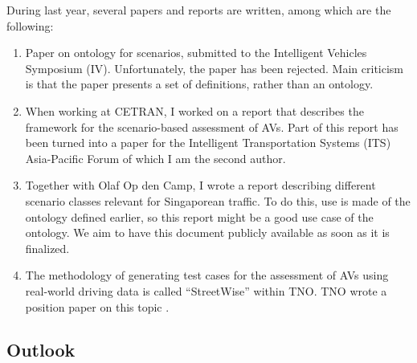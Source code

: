 During last year, several papers and reports are written, among which are the following:
\begin{enumerate}
	\item Paper on ontology for scenarios, submitted to the Intelligent Vehicles Symposium (IV). Unfortunately, the paper has been rejected. Main criticism is that the paper presents a set of definitions, rather than an ontology. 
	\item When working at CETRAN, I worked on a report that describes the framework for the scenario-based assessment of AVs. Part of this report has been turned into a paper for the Intelligent Transportation Systems (ITS) Asia-Pacific Forum \cite{ploeg2018cetran} of which I am the second author.
	\item Together with Olaf Op den Camp, I wrote a report describing different scenario classes relevant for Singaporean traffic. To do this, use is made of the ontology defined earlier, so this report might be a good use case of the ontology. We aim to have this document publicly available as soon as it is finalized. \label{item:scenario classes}
	\item The methodology of generating test cases for the assessment of AVs using real-world driving data is called ``StreetWise'' within TNO. TNO wrote a position paper on this topic \cite{elrofai2018scenario}.
\end{enumerate}

\subsection{Outlook}
\label{sec:outlook}

